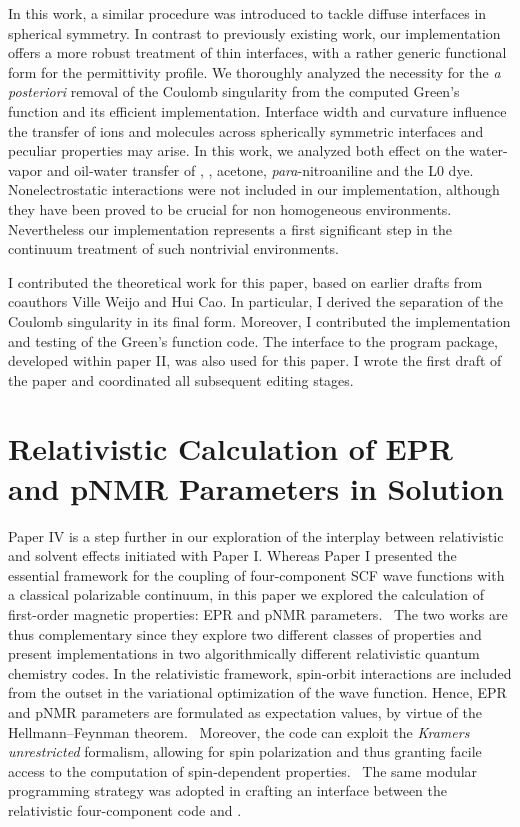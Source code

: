 In this work, a similar procedure was introduced to tackle diffuse interfaces
in spherical symmetry.
In contrast to previously existing work, our implementation offers a more robust
treatment of thin interfaces, with a rather generic functional form for the
permittivity profile.
We thoroughly analyzed the necessity for the \emph{a posteriori} removal of the
Coulomb singularity from the computed Green's function and its efficient
implementation.
Interface width and curvature influence the transfer of ions and molecules across
spherically symmetric interfaces and peculiar properties may arise.
In this work, we analyzed both effect on the water-vapor and oil-water transfer
of , , acetone, \emph{para}-nitroaniline and the L0 dye.
Nonelectrostatic interactions were not included in our implementation, although
they have been proved to be crucial for non homogeneous
environments.~\autocite{Mozgawa2014-ad}
Nevertheless our implementation represents a first significant step in the continuum treatment
of such nontrivial environments.

I contributed the theoretical work for this paper, based on earlier drafts from coauthors
Ville Weijo and Hui Cao. In particular, I derived the separation of
the Coulomb singularity in its final form.
Moreover, I contributed the implementation and testing of the Green's function code.
The interface to the \LSDALTON program package, developed within paper II, was
also used for this paper.
I wrote the first draft of the paper and coordinated all subsequent editing stages.

\section{Relativistic Calculation of EPR and pNMR Parameters in
Solution}\label{sec:pcmepr}

Paper IV is a step further in our exploration of the interplay between
relativistic and solvent effects initiated with Paper I.
Whereas Paper I presented the essential framework for the coupling of
four-component \acs{SCF} wave functions with a classical polarizable continuum,
in this paper we explored the calculation of first-order magnetic properties:
\ac{EPR} and \ac{pNMR} parameters.~\autocite{Repisky2010-ls, Malkin2011-nm,
Komorovsky2013-xa, Cherry2016-ij}
The two works are thus complementary since they explore two different classes
of properties and present implementations in two algorithmically different
relativistic quantum chemistry codes.
In the relativistic framework, spin-orbit interactions are included from the
outset in the variational optimization of the wave function.
Hence, \acs{EPR} and \acs{pNMR} parameters are formulated as expectation
values, by virtue of the Hellmann--Feynman theorem.~\autocite{Konishi2009-zb,
Helgaker2000-tz}
Moreover, the \ReSpect code can exploit the \emph{Kramers unrestricted} formalism,
allowing for spin polarization and thus granting facile access to the computation
of spin-dependent properties.~\autocite{Dyall2007-tu}
The same modular programming strategy was adopted in crafting an interface between the
relativistic four-component code \ReSpect\autocite{ReSpect-3.5.0} and \pcmsolver.

